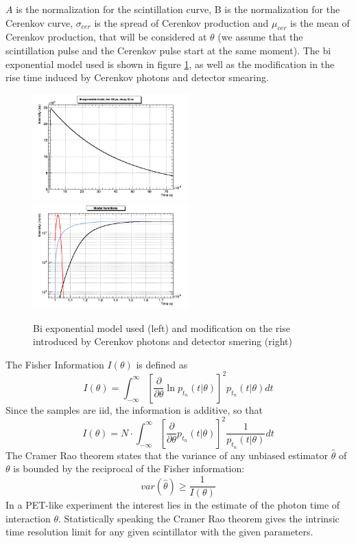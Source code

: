 $A$ is the normalization for the scintillation curve, B is the normalization for the Cerenkov curve, $\sigma _{cer}$ is the spread of Cerenkov production and $\mu _{cer}$ is the mean of Cerenkov production, that will be considered at $\theta$ (we assume that the scintillation pulse and the Cerenkov pulse start at the same moment).
The bi exponential model used is shown in figure \ref{fig:models}, as well as the modification in the rise time induced by Cerenkov photons and detector smearing.
\begin{figure}[htbp]
\begin{center}
\includegraphics[width=6cm]{../Pictures/Chapter_4/model.png}
\includegraphics[width=6cm]{../Pictures/Chapter_4/models.png}
\end{center}
\caption[Model functions]{Bi exponential model used (left) and modification on the rise introduced by Cerenkov photons and detector smering (right)}
\label{fig:models}
\end{figure}

The Fisher Information $I(\theta)$ is defined as
\begin{equation}
I(\theta) = \int _{-\infty} ^{\infty} \left[ \frac{\partial}{\partial \theta} \ln p_{t_{n}}(t|\theta) \right] ^{2} p_{t_{n}}(t|\theta)dt
\end{equation}
Since the samples are iid, the information is additive, so that
\begin{equation}
I(\theta) = N \cdot \int _{-\infty} ^{\infty} \left[ \frac{\partial}{\partial \theta} p_{t_{n}}(t|\theta) \right] ^{2} \frac{1}{p_{t_{n}}(t|\theta)}dt
\end{equation}
The Cramer Rao theorem states that the variance of any unbiased estimator $\hat{\theta}$ of $\theta$ is bounded by the reciprocal of the Fisher information:
\begin{equation}
var(\hat{\theta})\geq \frac{1}{I(\theta)}
\end{equation}
In a PET-like experiment the interest lies in the estimate of the photon time of interaction $\theta$.
Statistically speaking the Cramer Rao theorem gives the intrinsic time resolution limit for any given scintillator with the given parameters.


